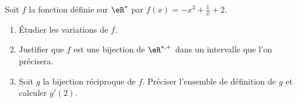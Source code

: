 
\begin{exercice}\label{exodevoir1ajout}





Soit $f$ la fonction définie sur $\eR^*$ par $f(x)=-x^3+\frac{1}{x}+2$.
\begin{enumerate}
\item Étudier les variations de $f$.
\item Justifier que $f$ est une bijection de  $\eR^{*,+}$ dans un intervalle que l'on précisera. 
\item Soit $g$ la bijection réciproque de $f$. Préciser l'ensemble de définition de $g$ et calculer $g'(2)$.
\end{enumerate}




\end{exercice}

